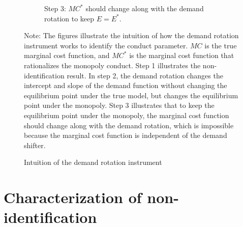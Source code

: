 \documentclass[11pt, a4paper]{article}
\theoremstyle{remark}
\begin{document}
\begin{figure}[th!]
\begin{center}
\begin{subfigure}[b]{0.5\textwidth}
            \caption{Step 3: $MC^{*}$ should change along with the demand rotation to keep $E = E^{*}$.}
            \label{fig:identification_example_step_3}
        \end{subfigure}
    \end{center}
    \caption{Intuition of the demand rotation instrument}
    \label{fig:identification_example}
    \vspace{2mm}
    \footnotesize
    Note: The figures illustrate the intuition of how the demand rotation instrument works to identify the conduct parameter.
    $MC$ is the true marginal cost function, and $MC^{*}$ is the marginal cost function that rationalizes the monopoly conduct.
    Step 1 illustrates the non-identification result.
    In step 2, the demand rotation changes the intercept and slope of the demand function without changing the equilibrium point under the true model, but changes the equilibrium point under the monopoly.
    Step 3 illustrates that to keep the equilibrium point under the monopoly, the marginal cost function should change along with the demand rotation, which is impossible because the marginal cost function is independent of the demand shifter.
\end{figure}





\section{Characterization of non-identification}\label{sec:non-identification_characterization}
\end{document}
